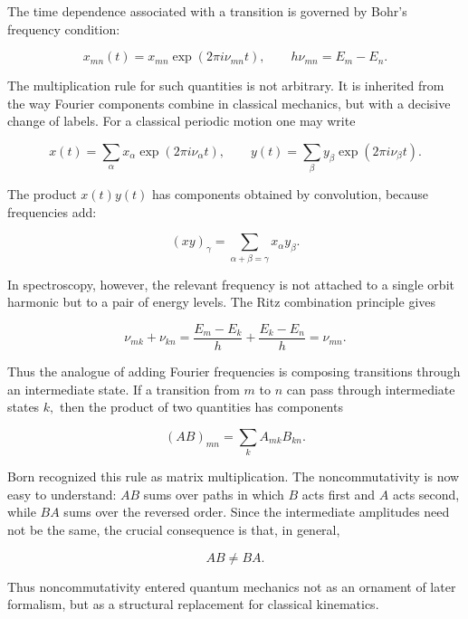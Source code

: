 The time dependence associated with a transition is governed by Bohr's frequency condition:
\begin{linenomath}
    \begin{equation}
        x_{mn}(t)=x_{mn}\exp\left(2\pi i\nu_{mn}t\right),
        \qquad
        h\nu_{mn}=E_m-E_n.
    \end{equation}
\end{linenomath}
The multiplication rule for such quantities is not arbitrary. It is inherited from the way Fourier components combine in classical mechanics, but with a decisive change of labels. For a classical periodic motion one may write
\begin{linenomath}
    \begin{equation}
        x(t)=\sum_{\alpha}x_{\alpha}\exp(2\pi i\nu_{\alpha}t),
        \qquad
        y(t)=\sum_{\beta}y_{\beta}\exp(2\pi i\nu_{\beta}t).
    \end{equation}
\end{linenomath}
The product $x(t)y(t)$ has components obtained by convolution, because frequencies add:
\begin{linenomath}
    \begin{equation}
        (xy)_{\gamma}
        =
        \sum_{\alpha+\beta=\gamma}x_{\alpha}y_{\beta}.
    \end{equation}
\end{linenomath}
In spectroscopy, however, the relevant frequency is not attached to a single orbit harmonic but to a pair of energy levels. The Ritz combination principle gives
\begin{linenomath}
    \begin{equation}
        \nu_{mk}+\nu_{kn}
        =
        \frac{E_m-E_k}{h}+\frac{E_k-E_n}{h}
        =
        \nu_{mn}.
    \end{equation}
\end{linenomath}
Thus the analogue of adding Fourier frequencies is composing transitions through an intermediate state. If a transition from $m$ to $n$ can pass through intermediate states $k,$ then the product of two quantities has components
\begin{linenomath}
    \begin{equation}
        (AB)_{mn}=\sum_k A_{mk}B_{kn}.
    \end{equation}
\end{linenomath}
Born recognized this rule as matrix multiplication. The noncommutativity is now easy to understand: $AB$ sums over paths in which $B$ acts first and $A$ acts second, while $BA$ sums over the reversed order. Since the intermediate amplitudes need not be the same, the crucial consequence is that, in general,
\begin{linenomath}
    \begin{equation}
        AB\neq BA.
    \end{equation}
\end{linenomath}
Thus noncommutativity entered quantum mechanics not as an ornament of later formalism, but as a structural replacement for classical kinematics.

